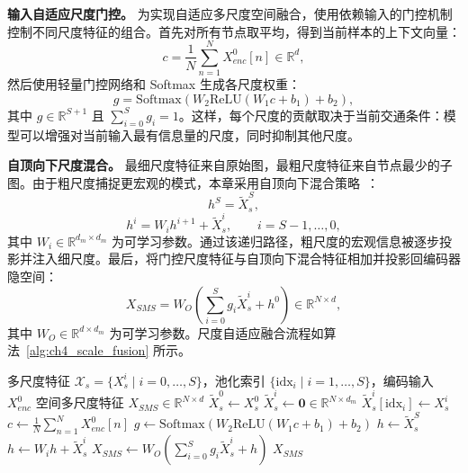 \textbf{输入自适应尺度门控。} 为实现自适应多尺度空间融合，使用依赖输入的门控机制控制不同尺度特征的组合。首先对所有节点取平均，得到当前样本的上下文向量：
\begin{equation}
c=\frac{1}{N}\sum_{n=1}^{N}X_{enc}^0[n]\in\mathbb{R}^{d},
\end{equation}
然后使用轻量门控网络和 Softmax 生成各尺度权重：
\begin{equation}
g=\mathrm{Softmax}\!\left(W_2\mathrm{ReLU}\!\left(W_1c+b_1\right)+b_2\right),
\end{equation}
其中 $g\in\mathbb{R}^{S+1}$ 且 $\sum_{i=0}^{S}g_i=1$。这样，每个尺度的贡献取决于当前交通条件：模型可以增强对当前输入最有信息量的尺度，同时抑制其他尺度。

\textbf{自顶向下尺度混合。} 最细尺度特征来自原始图，最粗尺度特征来自节点最少的子图。由于粗尺度捕捉更宏观的模式，本章采用自顶向下混合策略~\cite{timemixer}：
\begin{equation}
    h^S=\tilde{X}_s^S,
\end{equation}
\begin{equation}
    h^i=W_ih^{i+1}+\tilde{X}_s^i,
\qquad i=S-1,\ldots,0,
\end{equation}
其中 $W_i\in\mathbb{R}^{d_m\times d_m}$ 为可学习参数。通过该递归路径，粗尺度的宏观信息被逐步投影并注入细尺度。最后，将门控尺度特征与自顶向下混合特征相加并投影回编码器隐空间：
\begin{equation}
X_{SMS}=W_O\left(\sum_{i=0}^{S}g_i\tilde{X}_s^i+h^0\right)\in\mathbb{R}^{N\times d},
\end{equation}
其中 $W_O\in\mathbb{R}^{d\times d_m}$ 为可学习参数。尺度自适应融合流程如算法~\ref{alg:ch4_scale_fusion} 所示。

\begin{algorithm}[t!]
\caption{带散布对齐的尺度自适应融合}
\label{alg:ch4_scale_fusion}
\begin{algorithmic}[1]
\REQUIRE 多尺度特征 $\mathcal{X}_s=\{X_s^i\mid i=0,\ldots,S\}$，池化索引 $\{\mathrm{idx}_i\mid i=1,\ldots,S\}$，编码输入 $X_{enc}^0$
\ENSURE 空间多尺度特征 $X_{SMS}\in\mathbb{R}^{N\times d}$
\STATE $\tilde{X}_s^0\leftarrow X_s^0$
    \STATE $\tilde{X}_s^i\leftarrow\mathbf{0}\in\mathbb{R}^{N\times d_m}$
    \STATE $\tilde{X}_s^i[\mathrm{idx}_i]\leftarrow X_s^i$
\ENDFOR
\STATE $c\leftarrow\frac{1}{N}\sum_{n=1}^{N}X_{enc}^0[n]$
\STATE $g\leftarrow\mathrm{Softmax}\!\left(W_2\mathrm{ReLU}\!\left(W_1c+b_1\right)+b_2\right)$
\STATE $h\leftarrow\tilde{X}_s^S$
    \STATE $h\leftarrow W_ih+\tilde{X}_s^i$
\ENDFOR
\STATE $X_{SMS}\leftarrow W_O\left(\sum_{i=0}^{S}g_i\tilde{X}_s^i+h\right)$
\STATE \RETURN $X_{SMS}$
\end{algorithmic}
\end{algorithm}

